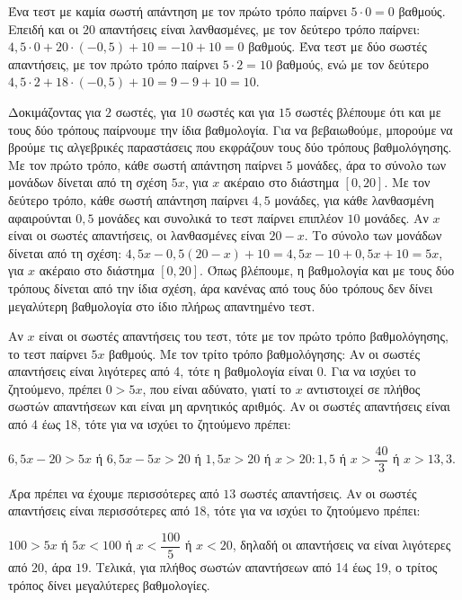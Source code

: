 
\begin{alist}
\item Ένα τεστ με καμία σωστή απάντηση με τον πρώτο τρόπο παίρνει $5 \cdot 0 = 0$ βαθμούς.
Επειδή και οι $20$ απαντήσεις είναι λανθασμένες, με τον δεύτερο τρόπο παίρνει:
$4,5 \cdot 0 + 20 \cdot (-0,5) + 10 = -10 + 10 = 0$ βαθμούς.
Ένα τεστ με δύο σωστές απαντήσεις, με τον πρώτο τρόπο παίρνει $5 \cdot 2 = 10$ βαθμούς, ενώ
με τον δεύτερο $4,5 \cdot 2 + 18 \cdot (-0,5) + 10 = 9 - 9 + 10 = 10$.

\item Δοκιμάζοντας για $2$ σωστές, για $10$ σωστές και για $15$ σωστές βλέπουμε ότι και με τους
δύο τρόπους παίρνουμε την ίδια βαθμολογία. Για να βεβαιωθούμε, μπορούμε να βρούμε
τις αλγεβρικές παραστάσεις που εκφράζουν τους δύο τρόπους βαθμολόγησης.
Με τον πρώτο τρόπο, κάθε σωστή απάντηση παίρνει $5$ μονάδες, άρα το σύνολο των
μονάδων δίνεται από τη σχέση $5x$, για $x$ ακέραιο στο διάστημα $[0, 20]$.
Με τον δεύτερο τρόπο, κάθε σωστή απάντηση παίρνει $4,5$ μονάδες, για κάθε λανθασμένη
αφαιρούνται $0,5$ μονάδες και συνολικά το τεστ παίρνει επιπλέον $10$ μονάδες.
Αν $x$ είναι οι σωστές απαντήσεις, οι λανθασμένες είναι $20 - x$.
Το σύνολο των μονάδων δίνεται από τη σχέση:
$4,5x - 0,5(20 - x) + 10 = 4,5x - 10 + 0,5x + 10 = 5x$, για $x$ ακέραιο στο διάστημα
$[0, 20]$.
Όπως βλέπουμε, η βαθμολογία και με τους δύο τρόπους δίνεται από την ίδια σχέση, άρα
κανένας από τους δύο τρόπους δεν δίνει μεγαλύτερη βαθμολογία στο ίδιο πλήρως
απαντημένο τεστ.

\item Αν $x$ είναι οι σωστές απαντήσεις του τεστ, τότε με τον πρώτο τρόπο βαθμολόγησης, το
τεστ παίρνει $5x$ βαθμούς.
Με τον τρίτο τρόπο βαθμολόγησης:
Αν οι σωστές απαντήσεις είναι λιγότερες από 4, τότε η βαθμολογία είναι $0$.
Για να ισχύει το ζητούμενο, πρέπει $0 > 5x$, που είναι αδύνατο, γιατί το $x$ αντιστοιχεί σε
πλήθος σωστών απαντήσεων και είναι μη αρνητικός αριθμός.
Αν οι σωστές απαντήσεις είναι από 4 έως 18, τότε για να ισχύει το ζητούμενο πρέπει:

$6,5x - 20 > 5x$ ή $6,5x - 5x > 20$ ή $1,5x > 20$ ή $x > 20 : 1,5$ ή $x > \dfrac{40}{3}$ ή $x > 13,3$.

Άρα πρέπει να έχουμε περισσότερες από $13$ σωστές απαντήσεις.
Αν οι σωστές απαντήσεις είναι περισσότερες από 18, τότε για να ισχύει το ζητούμενο
πρέπει:

$100 > 5x$ ή $5x < 100$ ή $x < \dfrac{100}{5}$ ή $x < 20$, δηλαδή οι απαντήσεις να είναι λιγότερες από
$20$, άρα $19$.
Τελικά, για πλήθος σωστών απαντήσεων από 14 έως 19, ο τρίτος τρόπος δίνει μεγαλύτερες
βαθμολογίες.
\end{alist}

